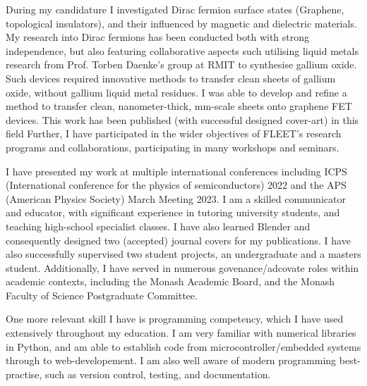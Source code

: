 \documentclass[10pt,a4paper,ragged2e,withhyper,paragraphstrue]{altacv}
\newcommand{\pind}{\hspace{24pt}}
\begin{document}
{    %
    \pind During my candidature I investigated Dirac fermion surface states (Graphene, topological insulators), and their influenced by
    magnetic and dielectric materials. My research into Dirac fermions has been conducted both with strong independence, but also 
    featuring collaborative aspects such utilising liquid metals research from Prof. Torben Daenke's group at RMIT to synthesise 
    gallium oxide. Such devices required innovative methods to transfer clean sheets of gallium oxide, without gallium liquid metal 
    residues. I was able to develop and refine a method to transfer clean, nanometer-thick, mm-scale sheets onto graphene FET devices.
    This work has been published (with successful designed cover-art) in this 
    field
    Further, I have participated in the wider objectives of FLEET's research programs and collaborations, participating in many 
    workshops and seminars.
    
    \pind I have presented my work at multiple international conferences including ICPS (International conference for the physics of
    semiconductors) 2022 and the APS (American Physics Society) March Meeting 2023. I am a skilled communicator and educator,
    with significant experience in tutoring university students, and teaching high-school specialist classes. I have also learned Blender
    and consequently designed two (accepted) journal covers for my publications. I have also successfully supervised two student projects, 
    an undergraduate and a masters student. Additionally, I have served in numerous govenance/adcovate roles within academic contexts, 
    including the Monash Academic Board, and the Monash Faculty of Science Postgraduate Committee. 

    \pind One more relevant skill I have is programming competency, which I have used extensively throughout my education. I am very familiar
    with numerical libraries in Python, and am able to establish code from microcontroller/embedded systems through to web-developement.
    I am also well aware of modern programming best-practise, such as version control, testing, and documentation.

}
\end{document}
